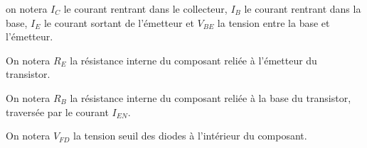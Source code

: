\documentclass[a4paper,french]{paper}
\begin{document}
\newpage

on notera $I_{C}$ le courant rentrant dans le collecteur, $I_{B}$ le courant rentrant dans la base, $I_{E}$ le courant sortant de l'émetteur et $V_{BE}$ la tension entre la base et l'émetteur.

On notera $R_E$ la résistance interne du composant reliée à l'émetteur du transistor.

On notera $R_B$ la résistance interne du composant reliée à la base du transistor, traversée par le courant $I_{EN}$.

On notera $V_{FD}$ la tension seuil des diodes à l'intérieur du composant.
\end{document}
